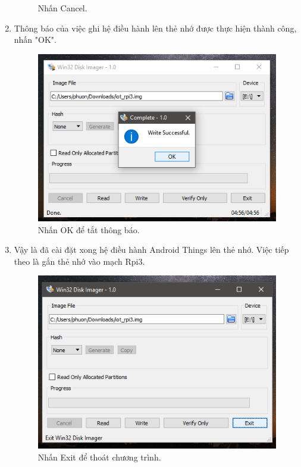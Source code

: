 \begin{enumerate}
\begin{center}
\begin{figure}[htp]
\begin{center}
\end{center}
\caption{Nhấn Cancel.}
\label{refhinh1}
\end{figure}
\end{center}
\newpage
\item Thông báo của việc ghi hệ điều hành lên thẻ nhớ được thực hiện thành công, nhấn "OK".
\begin{center}
\begin{figure}[htp]
\begin{center}
\includegraphics[scale=0.65]{image3/buoc2cach1s15.png}
\end{center}
\caption{Nhấn OK để tắt thông báo.}
\label{refhinh1}
\end{figure}
\end{center}
\item Vậy là đã cài đặt xong hệ điều hành Android Things lên thẻ nhớ. Việc tiếp theo là gắn thẻ nhớ vào mạch Rpi3.
\begin{center}
\begin{figure}[htp]
\begin{center}
\includegraphics[scale=0.65]{image3/buoc2cach1s16.png}
\end{center}
\caption{Nhấn Exit để thoát chương trình.}
\label{refhinh1}
\end{figure}
\end{center}
\end{enumerate}
